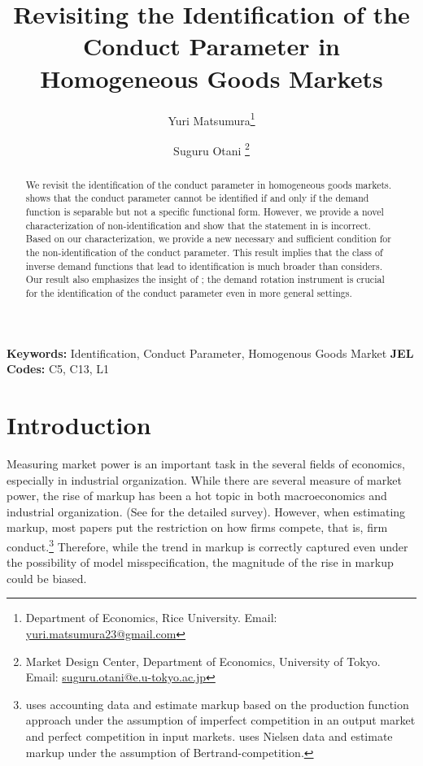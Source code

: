 \documentclass[11pt, a4paper]{article}
\title{Revisiting the Identification of the Conduct Parameter in Homogeneous Goods Markets}
\author{Yuri Matsumura\thanks{Department of Economics, Rice University. Email: \href{mailto:yuri.matsumura23@gmail.com}{yuri.matsumura23@gmail.com}} \and Suguru Otani \thanks{Market Design Center, Department of Economics, University of Tokyo. Email: \href{mailto:suguru.otani@e.u-tokyo.ac.jp}{suguru.otani@e.u-tokyo.ac.jp}
}}
\theoremstyle{remark}
\begin{document}
\maketitle
\begin{abstract}
    We revisit the identification of the conduct parameter in homogeneous goods markets.
    \citet{lau1982identifying} shows that the conduct parameter cannot be identified if and only if the demand function is separable but not a specific functional form.
    However, we provide a novel characterization of non-identification and show that the statement in \citet{lau1982identifying} is incorrect.
    Based on our characterization, we provide a new necessary and sufficient condition for the non-identification of the conduct parameter.
    This result implies that the class of inverse demand functions that lead to identification is much broader than \citet{lau1982identifying} considers.
    Our result also emphasizes the insight of \citet{bresnahan1982oligopoly}; the demand rotation instrument is crucial for the identification of the conduct parameter even in more general settings.
\end{abstract}

\noindent\textbf{Keywords:} Identification, Conduct Parameter, Homogenous Goods Market
\vspace{0in}
\newline
\noindent\textbf{JEL Codes:} C5, C13, L1

\bigskip




\newpage
\section{Introduction}
Measuring market power is an important task in the several fields of economics, especially in industrial organization.
While there are several measure of market power, the rise of markup has been a hot topic in both macroeconomics and industrial organization.
(See \citet{millerIndustrial2025} for the detailed survey).
However, when estimating markup, most papers put the restriction on how firms compete, that is, firm conduct.\footnote{
\citet{deloeckerRise2020} uses accounting data and estimate markup based on the production function approach under the assumption of imperfect competition in an output market and perfect competition in input markets.
\citet{dopperRising} uses Nielsen data and estimate markup under the assumption of Bertrand-competition.}
Therefore, while the trend in markup is correctly captured even under the possibility of model misspecification, the magnitude of the rise in markup could be biased.
\end{document}
